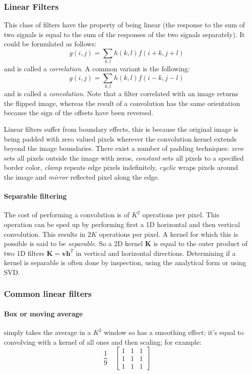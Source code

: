 \documentclass[a4paper,twocolumn]{article}
\begin{document}
\subsubsection{Linear Filters}
This class of filters have the property of being linear (the response to the sum
of two signals is equal to the sum of the responses of the two signals
separately). It could be formulated as follows:
\begin{equation}
g(i, j) = \sum_{k,l} h(k, l) f(i + k, j + l)
\end{equation}
and is called a \textit{correlation}. A common variant is the following:
\begin{equation}
g(i, j) = \sum_{k,l} h(k, l) f(i - k , j - l)
\end{equation}
and is called a \textit{convolution}. Note that a filter correlated with an
image returns the flipped image, whereas the result of a convolution has the
same orientation because the sign of the offsets have been reversed.

Linear filters suffer from boundary effects, this is because the original image
is being padded with zero valued pixels wherever the convolution kernel extends
beyond the image boundaries. There exist a number of padding techniques:
\textit{zero} sets all pixels outside the image with zeros, \textit{constant}
sets all pixels to a specified border color, \textit{clamp} repeats edge pixels
indefinitely, \textit{cyclic} wraps pixels around the image and \textit{mirror}
reflected pixel along the edge.

\paragraph{Separable filtering}
The cost of performing a convolution is of $K^2$ operations per pixel. This
operation can be sped up by performing first a 1D horizontal and then vertical
convolution. This results in $2K$ operations per pixel. A kernel for which this
is possible is said to be \textit{separable}. So a 2D kernel $\mathbf{K}$ is
equal to the outer product of two 1D filters
$\mathbf{K}=\mathbf{v}\mathbf{h}^T$ in vertical and horizontal directions.
Determining if a kernel is separable is often done by inspection, using the
analytical form or using SVD.

\subsubsection{Common linear filters}
\paragraph{Box or moving average} simply takes the average in a $K^2$ window so has
	a smoothing effect; it's equal to convolving with a kernel of all ones
	and then scaling; for example:
	\begin{equation}
		\frac{1}{9} \quad \begin{bmatrix}
			1 & 1 & 1 \\
			1 & 1 & 1 \\
			1 & 1 & 1
		\end{bmatrix}
	\end{equation}
\end{document}
